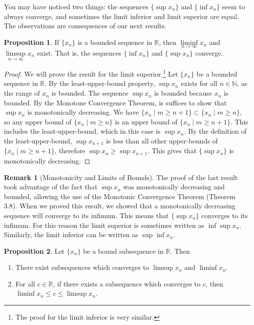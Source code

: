 \documentclass{article}
\newcommand{\N}{\mathbb{N}}
\newcommand{\R}{\mathbb{R}}
\theoremstyle{definition}
\newtheorem{proposition}{Proposition}[section]
\newtheorem{remark}{Remark}[section]
\begin{document}
You may have noticed two things: the sequences $ \{\sup x_n\} $ and $ \{\inf x_n\} $ seem to always converge, and sometimes the limit inferior and limit superior are equal. The observations are consequences of our next results. 
\begin{proposition}
	If $ \{x_n\} $ is a bounded sequence in $ \R $, then $ \liminf\limits_{n\to\infty} x_n $ and $ \limsup\limits_{n\to\infty} x_n $ exist. That is, the sequences $ \{\inf x_n\} $ and $ \{\sup x_n\} $ converge.
\end{proposition} 
\begin{proof}
	We will prove the result for the limit superior.\footnote{The proof for the limit inferior is very similar.} Let $ \{x_n\} $ be a bounded sequence in $ \R $. By the least-upper-bound property, $ \sup x_n $ exists for all $ n\in\N $, as the range of $ x_n $ is bounded. The sequence $ \sup x_n $ is bounded because $ x_n $ is bounded. By the Monotone Convergence Theorem, is suffices to show that $ \sup x_n $ is monotonically decreasing. We have $ \{x_n\mid m\ge n+1\}\subset \{x_n\mid m\ge n\} $, so any upper bound of $ \{x_n\mid m\ge n\} $ is an upper bound of  $ \{x_n\mid m\ge n+1\} $. This includes the least-upper-bound, which in this case is $ \sup x_n $. By the definition of the least-upper-bound, $ \sup x_{n+1} $ is less than all other upper-bounds of $ \{x_n\mid m\ge n+1\} $, therefore $ \sup x_n\ge \sup x_{n+1} $. This gives that $ \{\sup x_n\} $ is monotonically decreasing.   
\end{proof}
\begin{remark}[Monotonicity and Limits of Bounds]
	The proof of the last result took advantage of the fact that $ {\sup x_n} $ was monotonically decreasing and bounded, allowing the use of the Monotonic Convergence Theorem (Theorem 3.8). When we proved this result, we showed that a monotonically decreasing sequence will converge to its infimum. This means that $ \{\sup x_n\} $ converges to its infimum. For this reason the limit superior is sometimes written as $ \inf\sup x_n $. Similarly, the limit inferior can be written as $ \sup\inf x_n $. 
\end{remark}
\begin{proposition}
	Let $ \{x_n\} $ be a bound subsequence in $ \R $. Then 
	\begin{enumerate}
		\item There exist subsequences which converges to $ \limsup x_n $ and $ \liminf x_n $.
		\item For all $ c\in\R $, if there exists a subsequence which converges to $ c $, then $ \liminf x_n \le c\le \limsup x_n $. 
\end{enumerate}
\end{proposition}
\end{document}
